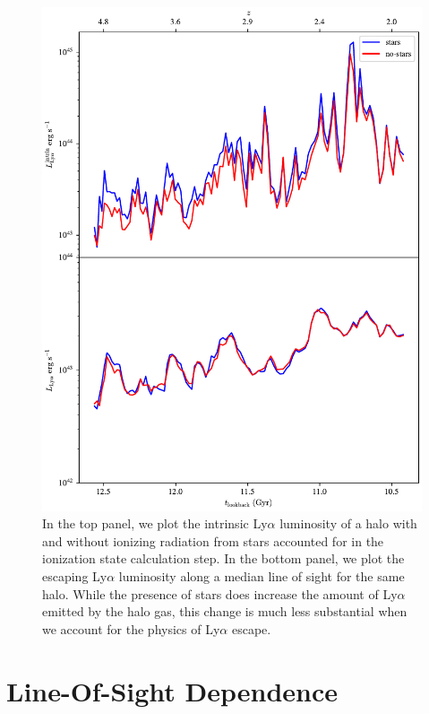 \begin{figure}
    \centering
    \includegraphics[width=\textwidth,height=0.85\textheight,keepaspectratio]{figures/stars.pdf}
    \caption{
        In the top panel, we plot the intrinsic Ly$\alpha$ luminosity of a halo with and without ionizing radiation from stars accounted for in the ionization state calculation step.
        In the bottom panel, we plot the escaping Ly$\alpha$ luminosity along a median line of sight for the same halo.
        While the presence of stars does increase the amount of Ly$\alpha$ emitted by the halo gas, this change is much less substantial when we account for the physics of Ly$\alpha$ escape.
    }
    \label{fig:stars}
\end{figure}


\section{Line-Of-Sight Dependence}

